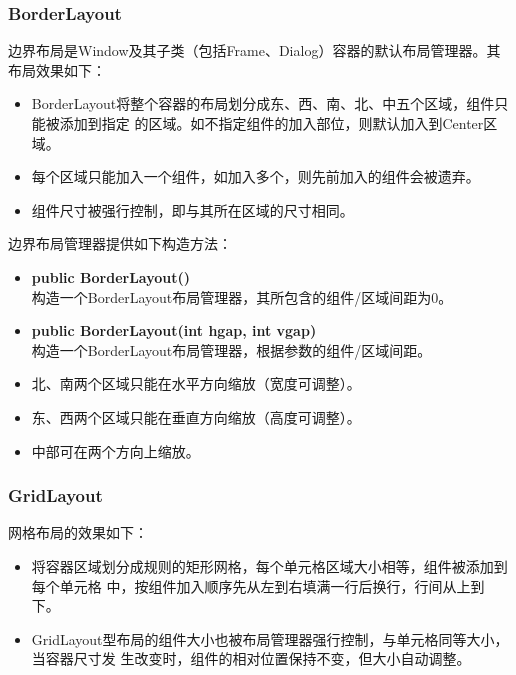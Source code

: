 

\subsubsection{BorderLayout}

边界布局是Window及其子类（包括Frame、Dialog）容器的默认布局管理器。其布局效果如下：

\begin{itemize}
\item BorderLayout将整个容器的布局划分成东、西、南、北、中五个区域，组件只能被添加到指定
  的区域。如不指定组件的加入部位，则默认加入到Center区域。
\item 每个区域只能加入一个组件，如加入多个，则先前加入的组件会被遗弃。
\item 组件尺寸被强行控制，即与其所在区域的尺寸相同。
\end{itemize}

边界布局管理器提供如下构造方法：
  
\begin{itemize}\kai
\item {\bf public BorderLayout()}\\
  构造一个BorderLayout布局管理器，其所包含的组件/区域间距为0。
\item {\bf public BorderLayout(int hgap, int vgap)}\\
  构造一个BorderLayout布局管理器，根据参数的组件/区域间距。
\end{itemize}


\begin{itemize}\kai
\item 北、南两个区域只能在水平方向缩放（宽度可调整）。
\item 东、西两个区域只能在垂直方向缩放（高度可调整）。
\item 中部可在两个方向上缩放。
\end{itemize}

\subsubsection{GridLayout}

网格布局的效果如下：

\begin{itemize}
\item 将容器区域划分成规则的矩形网格，每个单元格区域大小相等，组件被添加到每个单元格
  中，按组件加入顺序先从左到右填满一行后换行，行间从上到下。
\item GridLayout型布局的组件大小也被布局管理器强行控制，与单元格同等大小，当容器尺寸发
  生改变时，组件的相对位置保持不变，但大小自动调整。
\end{itemize}

